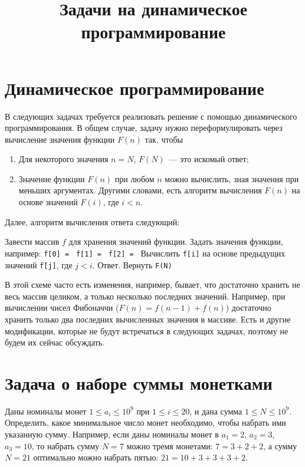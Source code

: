\documentclass{article}
\title{Задачи на динамическое программирование}
\author{}
\date{}
\begin{document}
    \maketitle

    \section{Динамическое программирование}
    В следующих задачах требуется реализовать решение с помощью динамического программирования.
    В общем случае, задачу нужно переформулировать через вычисление значения функции $F(n)$ так, чтобы
    \begin{enumerate}
        \item Для некоторого значения $n=N$, $F(N)$~--- это искомый ответ;
        \item Значение функции $F(n)$ при любом $n$ можно вычислить, зная значения при меньших аргументах.
        Другими словами, есть алгоритм вычисления $F(n)$ на основе значений $F(i)$, где $i < n$.
    \end{enumerate}
    Далее, алгоритм вычисления ответа следующий:

    \begin{algorithmic}[1]
        \State Завести массив $f$ для хранения значений функции.
        \State Задать значения функции, например:
        \State \verb|f[0] = |
        \State \verb|f[1] = |
        \State \verb|f[2] = |
            \State Вычислить \verb|f[i]| на основе предыдущих значений \verb|f[j]|, где $j < i$.
        \EndFor
        \State Ответ. Вернуть \verb|F(N)|
    \end{algorithmic}

    В этой схеме часто есть изменения, например, бывает, что достаточно хранить не весь массив целиком, а только
    несколько последних значений.
    Например, при вычислении чисел Фибоначчи ($F(n) = f(n - 1) + f(n)$) достаточно хранить
    только два последних вычисленных значения в массиве.
    Есть и другие модификации, которые не будут встречаться в следующих задачах, поэтому не будем их сейчас обсуждать.

    \section{Задача о наборе суммы монетками}
    Даны номиналы монет $1 \le a_i \le 10^9$ при $1 \le i \le 20$, и дана сумма $1 \le N \le 10^9$.
    Определить, какое минимальное число монет необходимо, чтобы набрать ими указанную сумму.
    Например, если даны номиналы монет в $a_1=2$, $a_2=3$, $a_3=10$, то набрать сумму $N=7$ можно тремя монетами: $7 = 3 + 2 + 2$, а сумму $N = 21$ оптимально можно набрать пятью: $21 = 10 + 3 + 3 + 3 + 2$.
\end{document}
